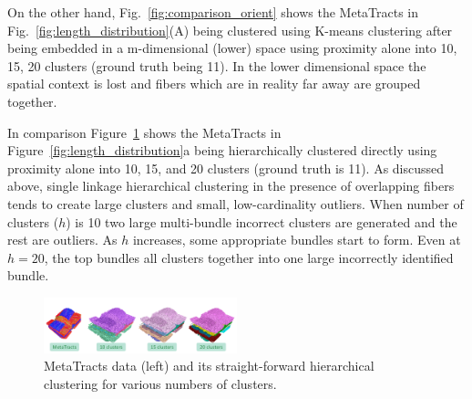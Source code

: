 On the other hand, Fig.~\ref{fig:comparison_orient} shows the MetaTracts in Fig.~\ref{fig:length_distribution}(A) being clustered using K-means clustering after being embedded  in a m-dimensional (lower) space using proximity alone into 10, 15, 20 clusters (ground truth being 11). In the lower dimensional space the spatial context is lost and fibers which are in reality far away are grouped together.   
  
  
In comparison Figure~\ref{fig:comparison} shows the MetaTracts in Figure~\ref{fig:length_distribution}a being hierarchically clustered directly using proximity alone into 10, 15, and 20 clusters (ground truth is 11). As discussed above, single linkage hierarchical clustering in the presence of overlapping fibers tends to create large clusters and small, low-cardinality outliers. When number of clusters ($h$) is 10 two large multi-bundle incorrect clusters are generated and the rest are outliers. As $h$ increases, some appropriate bundles start to form. Even at $h=20$, the top bundles all clusters together into one large incorrectly identified bundle.
\begin{figure}
	\centering
	\includegraphics[width=0.5\textwidth]{images_pvis/figure10}
	\caption{MetaTracts data (left) and its straight-forward hierarchical clustering for various numbers of clusters.}
	\label{fig:comparison}
\end{figure} 


